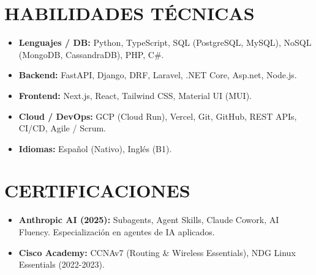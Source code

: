 \documentclass[letterpaper,11pt]{article}
\begin{document}
\vspace{-6pt}

\section{HABILIDADES TÉCNICAS}
 \small
 \begin{itemize}[leftmargin=0.15in, label={}]
   \item \textbf{Lenguajes / DB:} Python, TypeScript, SQL (PostgreSQL, MySQL), NoSQL (MongoDB, CassandraDB), PHP, C\#.
   \item \textbf{Backend:} FastAPI, Django, DRF, Laravel, .NET Core, Asp.net, Node.js.
   \item \textbf{Frontend:} Next.js, React, Tailwind CSS, Material UI (MUI).
   \item \textbf{Cloud / DevOps:} GCP (Cloud Run), Vercel, Git, GitHub, REST APIs, CI/CD, Agile / Scrum.
   \item \textbf{Idiomas:} Español (Nativo), Inglés (B1).
 \end{itemize}

\vspace{-12pt}

\section{CERTIFICACIONES}
  \begin{itemize}[leftmargin=0.15in, label={}]
    \item \small \textbf{Anthropic AI (2025):} Subagents, Agent Skills, Claude Cowork, AI Fluency. Especialización en agentes de IA aplicados.
    \item \small \textbf{Cisco Academy:} CCNAv7 (Routing \& Wireless Essentials), NDG Linux Essentials (2022-2023).
  \end{itemize}
\end{document}
